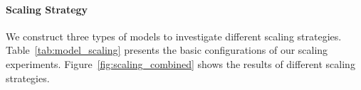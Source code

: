 
\paragraph{Scaling Strategy}
We construct three types of models to investigate different scaling strategies. Table~\ref{tab:model_scaling} presents the basic configurations of our scaling experiments. Figure~\ref{fig:scaling_combined} shows the results of different scaling strategies.

